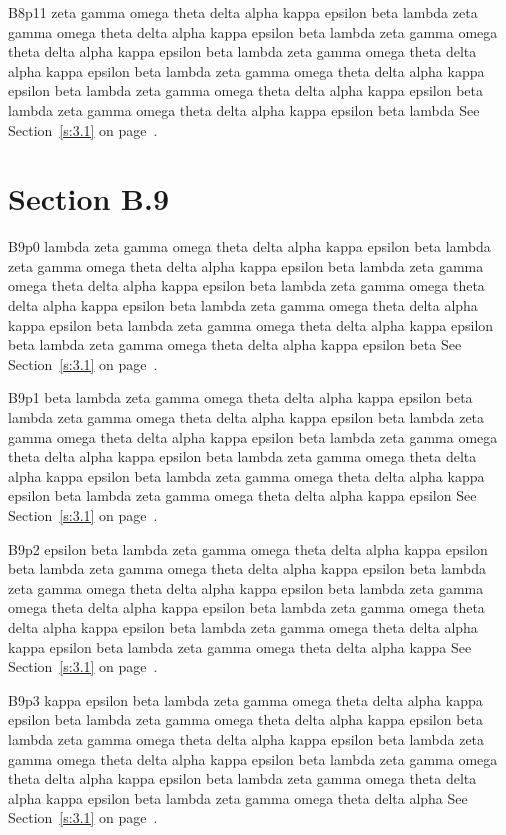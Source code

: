 B8p11 zeta gamma omega theta delta alpha kappa epsilon beta lambda zeta gamma omega theta delta alpha kappa epsilon beta lambda zeta gamma omega theta delta alpha kappa epsilon beta lambda zeta gamma omega theta delta alpha kappa epsilon beta lambda zeta gamma omega theta delta alpha kappa epsilon beta lambda zeta gamma omega theta delta alpha kappa epsilon beta lambda zeta gamma omega theta delta alpha kappa epsilon beta lambda See Section~\ref{s:3.1} on page~\pageref{s:3.1}.

\section{Section B.9}\label{s:B.9}
B9p0 lambda zeta gamma omega theta delta alpha kappa epsilon beta lambda zeta gamma omega theta delta alpha kappa epsilon beta lambda zeta gamma omega theta delta alpha kappa epsilon beta lambda zeta gamma omega theta delta alpha kappa epsilon beta lambda zeta gamma omega theta delta alpha kappa epsilon beta lambda zeta gamma omega theta delta alpha kappa epsilon beta lambda zeta gamma omega theta delta alpha kappa epsilon beta See Section~\ref{s:3.1} on page~\pageref{s:3.1}.

B9p1 beta lambda zeta gamma omega theta delta alpha kappa epsilon beta lambda zeta gamma omega theta delta alpha kappa epsilon beta lambda zeta gamma omega theta delta alpha kappa epsilon beta lambda zeta gamma omega theta delta alpha kappa epsilon beta lambda zeta gamma omega theta delta alpha kappa epsilon beta lambda zeta gamma omega theta delta alpha kappa epsilon beta lambda zeta gamma omega theta delta alpha kappa epsilon See Section~\ref{s:3.1} on page~\pageref{s:3.1}.

B9p2 epsilon beta lambda zeta gamma omega theta delta alpha kappa epsilon beta lambda zeta gamma omega theta delta alpha kappa epsilon beta lambda zeta gamma omega theta delta alpha kappa epsilon beta lambda zeta gamma omega theta delta alpha kappa epsilon beta lambda zeta gamma omega theta delta alpha kappa epsilon beta lambda zeta gamma omega theta delta alpha kappa epsilon beta lambda zeta gamma omega theta delta alpha kappa See Section~\ref{s:3.1} on page~\pageref{s:3.1}.

B9p3 kappa epsilon beta lambda zeta gamma omega theta delta alpha kappa epsilon beta lambda zeta gamma omega theta delta alpha kappa epsilon beta lambda zeta gamma omega theta delta alpha kappa epsilon beta lambda zeta gamma omega theta delta alpha kappa epsilon beta lambda zeta gamma omega theta delta alpha kappa epsilon beta lambda zeta gamma omega theta delta alpha kappa epsilon beta lambda zeta gamma omega theta delta alpha See Section~\ref{s:3.1} on page~\pageref{s:3.1}.

